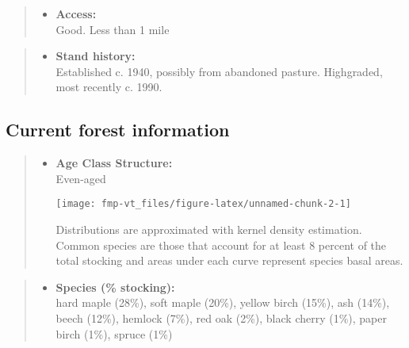 \documentclass[]{tufte-handout}
\providecommand{\tightlist}{%
  \setlength{\itemsep}{0pt}\setlength{\parskip}{0pt}}
\begin{document}
\begin{quote}
\begin{itemize}
\tightlist
\item
  \textbf{Access:}\\
  \vspace{2pt} Good. Less than 1 mile
\end{itemize}
\end{quote}

\begin{quote}
\begin{itemize}
\tightlist
\item
  \textbf{Stand history:}\\
  \vspace{2pt} Established c. 1940, possibly from abandoned pasture.
  Highgraded, most recently c. 1990.
\end{itemize}
\end{quote}

\subsection{Current forest
information}\label{current-forest-information}

\begin{quote}
\begin{itemize}
\tightlist
\item
  \textbf{Age Class Structure:}\\
  \vspace{2pt} Even-aged\\

  \begin{marginfigure}
  \texttt{[image: fmp-vt\_files/figure-latex/unnamed-chunk-2-1]} \caption[Distributions are approximated with kernel density estimation]{Distributions are approximated with kernel density estimation. Common species are those that account for at least 8 percent of the total stocking and areas under each curve represent species basal areas.}\label{fig:unnamed-chunk-2}
  \end{marginfigure}
\end{itemize}
\end{quote}

\begin{quote}
\begin{itemize}
\tightlist
\item
  \textbf{Species (\% stocking):}\\
  \vspace{2pt} hard maple (28\%), soft maple (20\%), yellow birch
  (15\%), ash (14\%), beech (12\%), hemlock (7\%), red oak (2\%), black
  cherry (1\%), paper birch (1\%), spruce (1\%)
\end{itemize}
\end{quote}
\end{document}
